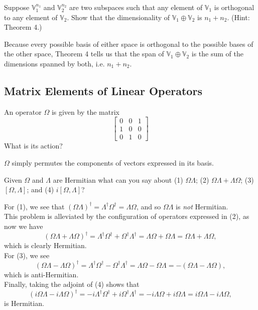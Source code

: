 \documentclass[../principles-of-quantum-mechanics.tex]{subfiles}
\begin{document}
\begin{questions}
\question Suppose $\mathbb{V}_1^{n_1}$ and $\mathbb{V}_2^{n_2}$ are two subspaces such that any element of $\mathbb{V}_1$ is orthogonal to any element of $\mathbb{V}_2$. Show that the dimensionality of $\mathbb{V}_1\oplus\mathbb{V}_2$ is $n_1 + n_2$. (Hint: Theorem 4.)

\begin{solution}
	Because every possible basis of either space is orthogonal to the possible bases  of the other space, Theorem 4 tells us that the span of $\mathbb{V}_1\oplus\mathbb{V}_2$ is the sum of the dimensions spanned by both, i.e. $n_1+n_2$.
\end{solution}

\setcounter{subsection}{5}
\setcounter{question}{0}
\subsection{Matrix Elements of Linear Operators}
\question An operator $\Omega$ is given by the matrix
\[
\begin{bmatrix}
0 & 0 & 1 \\
1 & 0 & 0 \\
0 & 1 & 0
\end{bmatrix}
\]
What is its action?

\begin{solution}
	$\Omega$ simply permutes the components of vectors expressed in its basis.
\end{solution}

\question Given $\Omega$ and $\Lambda$ are Hermitian what can you say about (1) $\Omega\Lambda$; (2) $\Omega\Lambda + \Lambda\Omega$; (3) $[\Omega, \Lambda]$; and (4) $i[\Omega,\Lambda]$?

\begin{solution}
	For (1), we see that $(\Omega\Lambda)^\dagger = \Lambda^\dagger\Omega^\dagger = \Lambda\Omega$, and so $\Omega\Lambda$ is \textit{not} Hermitian. \\
	
	This problem is alleviated by the configuration of operators expressed in (2), as now we have 
	\[
		(\Omega\Lambda + \Lambda\Omega)^\dagger = \Lambda^\dagger\Omega^\dagger + \Omega^\dagger\Lambda^\dagger = \Lambda\Omega + \Omega\Lambda = \Omega\Lambda + \Lambda\Omega,
	\]
	which is clearly Hermitian. \\
	
	For (3), we see
	\[
		(\Omega\Lambda - \Lambda\Omega)^\dagger = \Lambda^\dagger\Omega^\dagger - \Omega^\dagger\Lambda^\dagger = \Lambda\Omega - \Omega\Lambda = -(\Omega\Lambda - \Lambda\Omega),
	\]
	which is anti-Hermitian. \\
	Finally, taking the adjoint of (4) shows that
	\[
		(i\Omega\Lambda - i\Lambda\Omega)^\dagger = -i\Lambda^\dagger\Omega^\dagger + i\Omega^\dagger\Lambda^\dagger = -i\Lambda\Omega + i\Omega\Lambda = i\Omega\Lambda - i\Lambda\Omega,
	\]
	is Hermitian.
\end{solution}


\end{questions}
\end{document}
